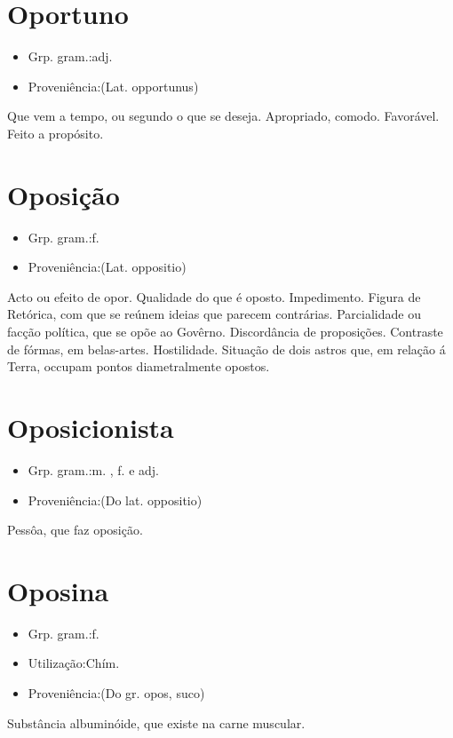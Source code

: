 \section{Oportuno}
\begin{itemize}
\item {Grp. gram.:adj.}
\end{itemize}
\begin{itemize}
\item {Proveniência:(Lat. \textunderscore opportunus\textunderscore )}
\end{itemize}
Que vem a tempo, ou segundo o que se deseja.
Apropriado, comodo.
Favorável.
Feito a propósito.
\section{Oposição}
\begin{itemize}
\item {Grp. gram.:f.}
\end{itemize}
\begin{itemize}
\item {Proveniência:(Lat. \textunderscore oppositio\textunderscore )}
\end{itemize}
Acto ou efeito de opor.
Qualidade do que é oposto.
Impedimento.
Figura de Retórica, com que se reúnem ideias que parecem contrárias.
Parcialidade ou facção política, que se opõe ao Govêrno.
Discordância de proposições.
Contraste de fórmas, em belas-artes.
Hostilidade.
Situação de dois astros que, em relação á Terra, occupam pontos diametralmente opostos.
\section{Oposicionista}
\begin{itemize}
\item {Grp. gram.:m. ,  f.  e  adj.}
\end{itemize}
\begin{itemize}
\item {Proveniência:(Do lat. \textunderscore oppositio\textunderscore )}
\end{itemize}
Pessôa, que faz oposição.
\section{Oposina}
\begin{itemize}
\item {Grp. gram.:f.}
\end{itemize}
\begin{itemize}
\item {Utilização:Chím.}
\end{itemize}
\begin{itemize}
\item {Proveniência:(Do gr. \textunderscore opos\textunderscore , suco)}
\end{itemize}
Substância albuminóide, que existe na carne muscular.
